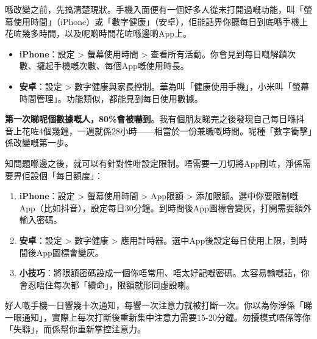 


喺改變之前，先搞清楚現狀。手機入面便有一個好多人從未打開過嘅功能，叫「螢幕使用時間」（iPhone）或「數字健康」（安卓），佢能話畀你聽每日到底喺手機上花咗幾多時間，以及呢啲時間花咗喺邊啲App上。

\begin{itemize}
  \item \textbf{iPhone}：設定 > 螢幕使用時間 > 查看所有活動。你會見到每日嘅解鎖次數、攞起手機嘅次數、每個App嘅使用時長。
  \item \textbf{安卓}：設定 > 數字健康與家長控制。華為叫「健康使用手機」，小米叫「螢幕時間管理」。功能類似，都能見到每日使用數據。
\end{itemize}

\textbf{第一次睇呢個數據嘅人，80\%會被嚇到}。我有個朋友睇完之後發現自己每日喺抖音上花咗4個幾鐘，一週就係28小時——相當於一份兼職嘅時間。呢種「數字衝擊」係改變嘅第一步。


知問題喺邊之後，就可以有針對性咁設定限制。唔需要一刀切將App刪咗，淨係需要畀佢設個「每日額度」：

\begin{enumerate}
  \item \textbf{iPhone}：設定 > 螢幕使用時間 > App限額 > 添加限額。選中你要限制嘅App（比如抖音），設定每日30分鐘。到時間後App圖標會變灰，打開需要額外輸入密碼。
  \item \textbf{安卓}：設定 > 數字健康 > 應用計時器。選中App後設定每日使用上限，到時間後App圖標會變灰。
  \item \textbf{小技巧}：將限額密碼設成一個你唔常用、唔太好記嘅密碼。太容易輸嘅話，你會忍唔住每次都「續命」，限額就形同虛設喇。
\end{enumerate}


好人嘅手機一日響幾十次通知，每響一次注意力就被打斷一次。你以為你淨係「睇一眼通知」，實際上每次打斷後重新集中注意力需要15-20分鐘。勿擾模式唔係等你「失聯」，而係幫你重新掌控注意力。

